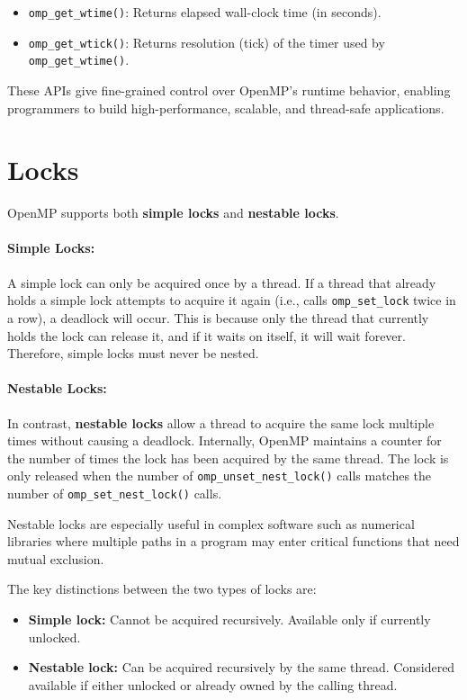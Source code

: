 \documentclass[12pt]{book}
\begin{document}
\begin{itemize}
    \item \texttt{omp\_get\_wtime()}: Returns elapsed wall-clock time (in seconds).
    \item \texttt{omp\_get\_wtick()}: Returns resolution (tick) of the timer used by \texttt{omp\_get\_wtime()}.
\end{itemize}

\vspace{0.5em}
These APIs give fine-grained control over OpenMP's runtime behavior, enabling programmers to build high-performance, scalable, and thread-safe applications.


\section{Locks}

OpenMP supports both \textbf{simple locks} and \textbf{nestable locks}. 

\paragraph{Simple Locks:} A simple lock can only be acquired once by a thread. If a thread that already holds a simple lock attempts to acquire it again (i.e., calls \texttt{omp\_set\_lock} twice in a row), a deadlock will occur. This is because only the thread that currently holds the lock can release it, and if it waits on itself, it will wait forever. Therefore, simple locks must never be nested.

\paragraph{Nestable Locks:} In contrast, \textbf{nestable locks} allow a thread to acquire the same lock multiple times without causing a deadlock. Internally, OpenMP maintains a counter for the number of times the lock has been acquired by the same thread. The lock is only released when the number of \texttt{omp\_unset\_nest\_lock()} calls matches the number of \texttt{omp\_set\_nest\_lock()} calls. 

Nestable locks are especially useful in complex software such as numerical libraries where multiple paths in a program may enter critical functions that need mutual exclusion.

\vspace{1em}
\noindent
The key distinctions between the two types of locks are:
\begin{itemize}
    \item \textbf{Simple lock:} Cannot be acquired recursively. Available only if currently unlocked.
    \item \textbf{Nestable lock:} Can be acquired recursively by the same thread. Considered available if either unlocked or already owned by the calling thread.
\end{itemize}
\end{document}
